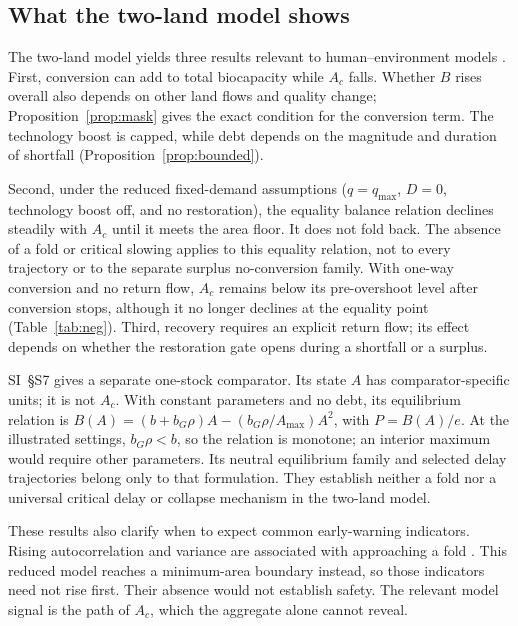 \documentclass[preprint,12pt,authoryear]{elsarticle}
\begin{document}
\subsection{What the two-land model shows}

The two-land model yields three results relevant to human--environment models \citep{Schaefer1954,May1973,Meadows1972,Meadows2004,WackernagelRees1996,BranderTaylor1998}. First, conversion can add to total biocapacity while $A_c$ falls. Whether $B$ rises overall also depends on other land flows and quality change; Proposition~\ref{prop:mask} gives the exact condition for the conversion term. The technology boost is capped, while debt depends on the magnitude and duration of shortfall (Proposition~\ref{prop:bounded}).

Second, under the reduced fixed-demand assumptions ($q=q_{\max}$, $D=0$, technology boost off, and no restoration), the equality balance relation declines steadily with $A_c$ until it meets the area floor. It does not fold back. The absence of a fold or critical slowing applies to this equality relation, not to every trajectory or to the separate surplus no-conversion family. With one-way conversion and no return flow, $A_c$ remains below its pre-overshoot level after conversion stops, although it no longer declines at the equality point (Table~\ref{tab:neg}). Third, recovery requires an explicit return flow; its effect depends on whether the restoration gate opens during a shortfall or a surplus.

SI~\S S7 gives a separate one-stock comparator. Its state $A$ has comparator-specific units; it is not $A_c$. With constant parameters and no debt, its equilibrium relation is $B(A)=(b+b_G\rho)A-(b_G\rho/A_{\max})A^2$, with $P=B(A)/e$. At the illustrated settings, $b_G\rho<b$, so the relation is monotone; an interior maximum would require other parameters. Its neutral equilibrium family and selected delay trajectories belong only to that formulation. They establish neither a fold nor a universal critical delay or collapse mechanism in the two-land model.

These results also clarify when to expect common early-warning indicators. Rising autocorrelation and variance are associated with approaching a fold \citep{Scheffer2001}. This reduced model reaches a minimum-area boundary instead, so those indicators need not rise first. Their absence would not establish safety. The relevant model signal is the path of $A_c$, which the aggregate alone cannot reveal.
\end{document}
